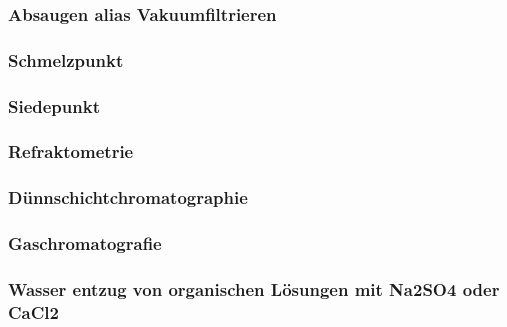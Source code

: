 \subsubsection*{Absaugen alias Vakuumfiltrieren}
\subsubsection*{Schmelzpunkt}
\subsubsection*{Siedepunkt}
\subsubsection*{Refraktometrie}
\subsubsection*{Dünnschichtchromatographie}

\subsubsection*{Gaschromatografie}
\subsubsection*{Wasser entzug von organischen Lösungen mit Na2SO4 oder CaCl2}